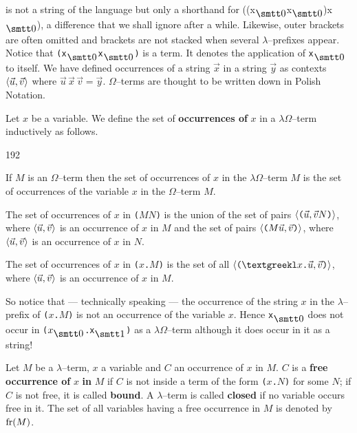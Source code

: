 is not a string of the language but only a shorthand for 
{\mtt ((x$_{\snull}$x$_{\snull}$)x$_{\snull}$)}, a difference that 
we shall ignore after a while. Likewise, outer brackets are often 
omitted and brackets are not stacked when several $\lambda$--prefixes 
appear. Notice that {\tt (x$_{\snull}$x$_{\snull}$)} is a term.  
It denotes the application of {\tt x$_{\snull}$} to itself. 
We have defined occurrences of a string $\vec{x}$ in a
string $\vec{y}$ as contexts $\langle \vec{u}, \vec{v}\rangle$ where 
$\vec{u}\,\vec{x}\,\vec{v} = \vec{y}$. $\Omega$--terms are thought 
to be written down in Polish Notation.
\begin{defn}
Let $x$ be a variable. We define the set of \textbf{occurrences of} 
$x$ in a $\lambda\Omega$--term inductively as follows.
\begin{dingautolist}{192}
\item If $M$ is an $\Omega$--term then the set of occurrences
    of $x$ in the $\lambda\Omega$--term $M$ is the set of
    occurrences of the variable $x$ in the $\Omega$--term $M$.
\item The set of occurrences of $x$ in {\tt ($MN$)}
    is the union of the set of pairs $\langle \mbox{\tt (}\vec{u},
    \vec{v}N\mbox{\tt )}\rangle$, where $\langle \vec{u}, \vec{v}\rangle$ is
    an occurrence of $x$ in $M$ and the set of pairs
    $\langle \mbox{\tt (}M\vec{u},\vec{v}\mbox{\tt)}\rangle$,
    where $\langle \vec{u}, \vec{v}\rangle$ is an occurrence of
    $x$ in $N$.
\item The set of occurrences of $x$ in {\tt (\stlambda$x$.$M$)}
    is the set of all $\auf \mbox{\tt (\stlambda$x$.$\vec{u}$},
    \vec{v}\mbox{\tt )}\zu$, where $\langle \vec{u}, \vec{v}\rangle$
    is an occurrence of $x$ in $M$.
\end{dingautolist}
\end{defn}
So notice that --- technically speaking --- the occurrence of the
string $x$ in the $\lambda$--prefix of {\tt (\stlambda$x$.$M$)} 
is not an occurrence of the variable $x$. Hence {\tt x$_{\snull}$} does 
not occur in {\tt (\stlambda$x_{\snull}$.x$_{\seins}$)} as a 
$\lambda\Omega$--term although it does occur in it as a string!
\begin{defn}
Let $M$ be a $\lambda$--term, $x$ a variable and $C$ an occurrence
of $x$ in $M$. $C$ is a \textbf{free occurrence of} $x$ \textbf{in}
$M$ if $C$ is not inside a term of the form {\tt (\stlambda$x$.$N$)} 
for some $N$; if $C$ is not free, it is called \textbf{bound}. A 
$\lambda$--term is called \textbf{closed} if no variable occurs free 
in it. The set of all variables having a free occurrence in $M$ 
is denoted by $\operatorname{fr}(M)$.  
\end{defn}
